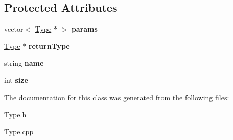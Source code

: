 \subsection*{Protected Attributes}
\begin{DoxyCompactItemize}
\item 
\hypertarget{classFunctionType_a83a13121b4be94af8ca95104030e7873}{vector$<$ \hyperlink{classType}{Type} $\ast$ $>$ {\bfseries params}}\label{classFunctionType_a83a13121b4be94af8ca95104030e7873}

\item 
\hypertarget{classFunctionType_a4512eaeaafe53ef9056acd3314263aaa}{\hyperlink{classType}{Type} $\ast$ {\bfseries return\-Type}}\label{classFunctionType_a4512eaeaafe53ef9056acd3314263aaa}

\item 
\hypertarget{classType_ad7eeefba3dfcecbdaa98d46aaa84e389}{string {\bfseries name}}\label{classType_ad7eeefba3dfcecbdaa98d46aaa84e389}

\item 
\hypertarget{classType_a871302dc63ac1a37c0b6a225cf82048d}{int {\bfseries size}}\label{classType_a871302dc63ac1a37c0b6a225cf82048d}

\end{DoxyCompactItemize}


The documentation for this class was generated from the following files\-:\begin{DoxyCompactItemize}
\item 
Type.\-h\item 
Type.\-cpp\end{DoxyCompactItemize}
